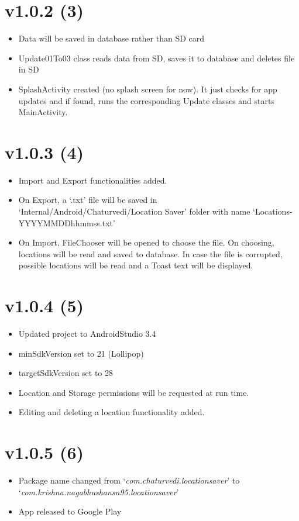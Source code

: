 \documentclass{article}
\begin{document}
    \section{v1.0.2 (3)}\label{sec:3}
    \begin{itemize}
        \item Data will be saved in database rather than SD card
        \item Update01To03 class reads data from SD, saves it to database and deletes file in SD
        \item SplashActivity created (no splash screen for now). It just checks for app updates and if found, runs the corresponding Update classes and starts MainActivity.
    \end{itemize}


    \section{v1.0.3 (4)}\label{sec:4}
    \begin{itemize}
        \item Import and Export functionalities added.
        \item On Export, a `.txt' file will be saved in `Internal/Android/Chaturvedi/Location Saver' folder with name `Locations-YYYYMMDDhhmmss.txt'
        \item On Import, FileChooser will be opened to choose the file. On choosing, locations will be read and saved to database. In case the file is corrupted, possible locations will be read and a Toast text will be displayed.
    \end{itemize}


    \section{v1.0.4 (5)}\label{sec:5}
    \begin{itemize}
        \item Updated project to AndroidStudio 3.4
        \item minSdkVersion set to 21 (Lollipop)
        \item targetSdkVersion set to 28
        \item Location and Storage permissions will be requested at run time.
        \item Editing and deleting a location functionality added.
    \end{itemize}


    \section{v1.0.5 (6)}\label{sec:6}
    \begin{itemize}
        \item Package name changed from `\textit{com.chaturvedi.locationsaver}' to `\textit{com.krishna.nagabhushansn95.locationsaver}'
        \item App released to Google Play
    \end{itemize}
\end{document}
